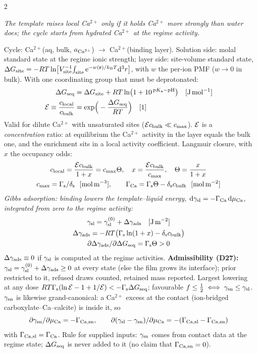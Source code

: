 \documentclass[9pt]{extarticle}
\newcommand{\hd}[1]{\par\smallskip{\normalsize\bfseries #1}\par\nopagebreak}
\newcommand{\phys}[1]{\textit{#1}}
\begin{document}
\begin{multicols}{2}
\hd{2\quad Sequestration (C2, \Rs)}
\phys{The template raises local Ca$^{2+}$ only if it holds Ca$^{2+}$ more strongly than water does; the cycle starts from hydrated Ca$^{2+}$ at the regime activity.}\par
Cycle: Ca$^{2+}$(aq, bulk, $a_{\mathrm{Ca}^{2+}}$) $\to$ Ca$^{2+}$(binding layer). Solution side: molal standard state at the regime ionic strength; layer side: site-volume standard state, $\Delta G_\mathrm{site}=-R T\ln\!\big[V_\mathrm{site}^{-1}\!\int_\mathrm{site}\mathrm{e}^{-w(\mathbf r)/k_\mathrm{B} T}\mathrm{d}^3r\big]$, with $w$ the per-ion PMF ($w\to0$ in bulk). With one coordinating group that must be deprotonated:
\begin{align}
\Delta G_\mathrm{seq} &= \Delta G_\mathrm{site} + R T\ln\!\big(1+10^{\,\mathrm{p}K_\mathrm{a}-\mathrm{pH}}\big) \quad[\mathrm{J\,mol^{-1}}]\\
\mathcal{E} \equiv \frac{c_\mathrm{local}}{c_\mathrm{bulk}} &= \exp\!\Big(-\frac{\Delta G_\mathrm{seq}}{R T}\Big) \quad[\mathrm{1}]
\end{align}
Valid for dilute Ca$^{2+}$ with unsaturated sites ($\mathcal{E}c_\mathrm{bulk}\ll c_\mathrm{max}$). $\mathcal{E}$ is a \emph{concentration} ratio: at equilibrium the Ca$^{2+}$ activity in the layer equals the bulk one, and the enrichment sits in a local activity coefficient. Langmuir closure, with $x$ the occupancy odds:
\begin{gather}
\cl=\frac{\Eenr\cb}{1+x}=\cmax\Theta,\quad x=\frac{\Eenr\cb}{\cmax},\quad \Theta=\frac{x}{1+x}\\
\cmax=\Gs/\ds\ \ [\mathrm{mol\,m^{-3}}],\qquad \GCa=\Gs\Theta-\ds\cb\ \ [\mathrm{mol\,m^{-2}}]\nonumber
\end{gather}
\phys{Gibbs adsorption: binding lowers the template--liquid energy, $\mathrm{d}\gamma_\mathrm{sl}=-\Gamma_\mathrm{Ca}\,\mathrm{d}\mu_\mathrm{Ca}$, integrated from zero to the regime activity:}
\begin{gather}
\gamma_\mathrm{sl}=\gamma_\mathrm{sl}^{(0)}+\Delta\gamma_\mathrm{ads} \quad[\mathrm{J\,m^{-2}}]\\
\Delta\gamma_\mathrm{ads}=-R T\big(\Gamma_\mathrm{s}\ln(1+x)-\delta_\mathrm{s}c_\mathrm{bulk}\big)\nonumber\\
\partial\Delta\gamma_\mathrm{ads}/\partial\Delta G_\mathrm{seq}=\Gamma_\mathrm{s}\Theta>0\nonumber
\end{gather}
$\Delta\gamma_\mathrm{ads}\equiv0$ if $\gamma_\mathrm{sl}$ is computed at the regime activities. \textbf{Admissibility (D27):} $\gamma_\mathrm{sl}=\gamma_\mathrm{sl}^{(0)}+\Delta\gamma_\mathrm{ads}\ge0$ at every state (else the film grows its interface); prior restricted to it, refused draws counted, retained mass reported. Largest lowering at any dose $R T\Gamma_\mathrm{s}(\ln\mathcal{E}-1+1/\mathcal{E})<-\Gamma_\mathrm{s}\Delta G_\mathrm{seq}$; favourable $f\le\tfrac12\iff\gamma_\mathrm{sn}\le\gamma_\mathrm{sl}$. $\gamma_\mathrm{sn}$ is likewise grand-canonical: a Ca$^{2+}$ excess at the contact (ion-bridged carboxylate--Ca--calcite) is inside it, so
\begin{equation}
\partial\gamma_\mathrm{sn}/\partial\mu_\mathrm{Ca}=-\Gamma_\mathrm{Ca,sn},\qquad \partial(\gamma_\mathrm{sl}-\gamma_\mathrm{sn})/\partial\mu_\mathrm{Ca}=-(\Gamma_\mathrm{Ca,sl}-\Gamma_\mathrm{Ca,sn})
\end{equation}
with $\Gamma_\mathrm{Ca,sl}=\Gamma_\mathrm{Ca}$. Rule for supplied inputs: $\gamma_\mathrm{sn}$ comes from contact data at the regime state; $\Delta G_\mathrm{seq}$ is never added to it (no claim that $\Gamma_\mathrm{Ca,sn}=0$).


\end{multicols}
\end{document}
